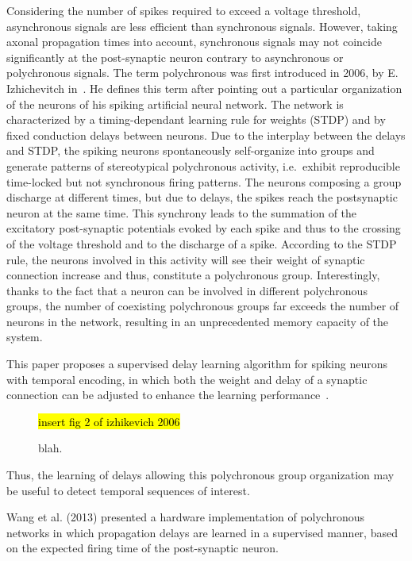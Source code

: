 \documentclass[brainsci, %
               review,submit,pdftex,moreauthors]{Definitions/mdpi}
\newcommand{\note}[1]{{\sethlcolor{yellow}\hl{#1}}}
\begin{document}
Considering the number of spikes required to exceed a voltage threshold, asynchronous signals are less efficient than synchronous signals. However, taking axonal propagation times into account, synchronous signals may not coincide significantly at the post-synaptic neuron contrary to asynchronous or polychronous signals. The term polychronous was first introduced in 2006, by E. Izhichevitch in~\citep{izhikevich_polychronization_2006}. He defines this term after pointing out a particular organization of the neurons of his spiking artificial neural network. The network is characterized by a timing-dependant learning rule for weights (STDP) and by fixed conduction delays between neurons. Due to the interplay between the delays and STDP, the spiking neurons spontaneously self-organize into groups and generate patterns of stereotypical polychronous activity, i.e.~exhibit reproducible time-locked but not synchronous firing patterns. The neurons composing a group discharge at different times, but due to delays, the spikes reach the postsynaptic neuron at the same time. This synchrony leads to the summation of the excitatory post-synaptic potentials evoked by each spike and thus to the crossing of the voltage threshold and to the discharge of a spike. According to the STDP rule, the neurons involved in this activity will see their weight of synaptic connection increase and thus, constitute a polychronous group. Interestingly, thanks to the fact that a neuron can be involved in different polychronous groups, the number of coexisting polychronous groups far exceeds the number of neurons in the network, resulting in an unprecedented memory capacity of the system.

This paper proposes a supervised delay learning algorithm for spiking neurons with temporal encoding, in which both the weight and delay of a synaptic connection can be adjusted to enhance the learning performance~\citep{wang}.

\begin{figure}
\centering
\note{insert fig 2 of izhikevich 2006}
\caption{blah.}\label{fig:PG}
\end{figure}



Thus, the learning of delays allowing this polychronous group organization may be useful to detect temporal sequences of interest.


Wang et al. (2013) presented a hardware implementation of polychronous networks in which propagation delays are learned in a supervised manner, based on the expected firing time of the post-synaptic neuron.
 
\end{document}
